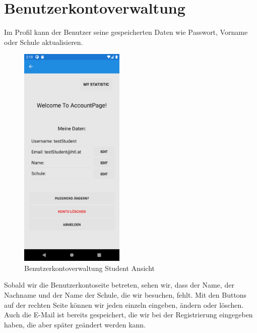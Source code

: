 \section{Benutzerkontoverwaltung}
Im Profil kann der Benutzer seine gespeicherten Daten wie Passwort, Vorname oder
Schule aktualisieren.
\begin{figure}[h]
    \begin{center}
        \includegraphics*[width=5cm]{pics/Xamarin Student/13 My Acc.png}
        \caption[MyAccount]{Benutzerkontoverwaltung Student Ansicht}
    \end{center}
\end{figure}
\newpage
Sobald wir die Benutzerkontoseite betreten, sehen wir, dass der Name, der Nachname und der Name der Schule, die wir besuchen, fehlt. Mit den Buttons auf der rechten Seite können wir jeden einzeln eingeben, ändern oder löschen. Auch die E-Mail ist bereits gespeichert, die wir bei der Registrierung eingegeben haben, die aber später geändert werden kann.
